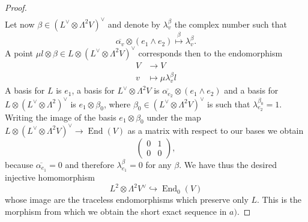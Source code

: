 \documentclass[A4paper, 12pt, british, reqno]{amsart}
\DeclareMathOperator{\End}{End}
\newcommand{\ot}{\otimes}
\newcommand{\dual}{^{\vee}}
\begin{document}
\begin{lm}
\begin{proof}
\begin{align*}
	\end{align*}
	Let now $\beta\in (L\dual \ot \Lambda^{2}V)\dual$ and denote by $\lambda_{v}^{\beta}$ the complex number such that
	\[ \overline{\alpha_{v}}\ot (e_{1}\wedge e_{2})\overset{\beta}{\longmapsto} \lambda_{v}^{\beta}. \]
	A point $\mu l\ot \beta\in L\ot (L\dual\ot \Lambda^{2}V)\dual$ corresponds then to the endomorphism
	\begin{align*}
	    V &\longrightarrow V \\
	    v &\longmapsto \mu \lambda_{v}^{\beta}l
	\end{align*}
	A basis for $L$ is $e_{1}$, a basis for $L\dual \ot \Lambda^{2}V$ is $\overline{\alpha_{e_{2}}}\ot (e_{1}\wedge e_{2})$ and a basis for $L\ot (L\dual\ot \Lambda^{2})\dual$ is $e_{1}\ot \beta_{0}$, where $\beta_{0}\in (L\dual \ot \Lambda^{2}V)\dual$ is such that $\lambda_{e_{2}}^{\beta_{0}}=1$.
	Writing the image of the basis $e_{1}\ot \beta_{0}$ under the map $L\ot (L\dual\ot \Lambda^{2}V)\dual\to \End(V)$ as a matrix with respect to our bases we obtain
	\[
	    \begin{pmatrix}
		0 & 1 \\
		0 & 0
	    \end{pmatrix},
	\]
	because $\overline{\alpha_{e_{1}}}=0$ and therefore $\lambda_{e_{1}}^{\beta}=0$ for any $\beta$.
	We have thus the desired injective homomorphism
	\[ L^{2}\ot \Lambda^{2}V\dual\hookrightarrow \End_{0}(V) \]
	whose image are the traceless endomorphisms which preserve only $L$.
	This is the morphism from which we obtain the short exact sequence in $a)$.


\end{proof}
\end{lm}
\end{document}
